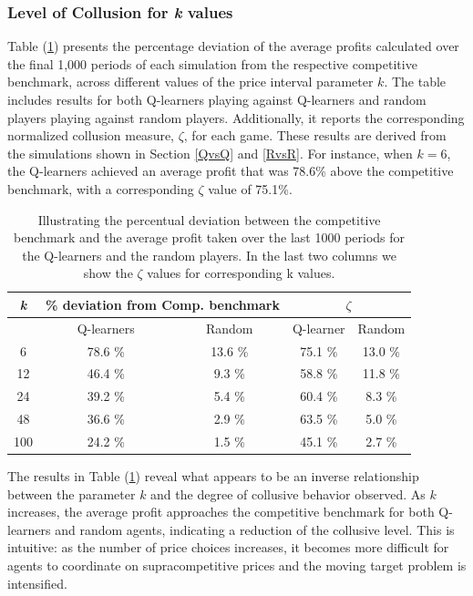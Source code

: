 \documentclass{article}
\begin{document}
\subsubsection{Level of Collusion for \textit{k} values}
\label{Level of Collusion for k values}
Table (\ref{tab:LevelCollusion}) presents the percentage deviation of the average profits calculated over the final 1,000 periods of each simulation from the respective competitive benchmark, across different values of the price interval parameter $k$. The table includes results for both Q-learners playing against Q-learners and random players playing against random players. Additionally, it reports the corresponding normalized collusion measure, $\zeta$, for each game. These results are derived from the simulations shown in Section \ref{QvsQ} and \ref{RvsR}. For instance, when $k = 6$, the Q-learners achieved an average profit that was 78.6\% above the competitive benchmark, with a corresponding $\zeta$ value of 75.1\%.
\begin{table}[H]
    \centering
    \begin{tabular}{|c|c|c|c|c|}
        \hline
        \textit{k} & \multicolumn{2}{c|}{\% deviation from Comp. benchmark} & \multicolumn{2}{c|}{$\zeta$}\\
        \hline
        & Q-learners & Random & Q-learner & Random \\
        \hline
        6 & 78.6 \%  & 13.6 \% & 75.1 \% & 13.0 \% \\
        \hline
        12 & 46.4 \% & 9.3 \%  & 58.8 \% & 11.8 \% \\
        \hline 
        24 & 39.2 \% & 5.4 \%  & 60.4 \% & 8.3 \% \\
        \hline
        48 & 36.6 \% & 2.9 \%  & 63.5 \% & 5.0 \% \\
        \hline
        100 & 24.2 \% & 1.5 \%  & 45.1 \% & 2.7 \% \\
        \hline
    \end{tabular}
    \caption{Illustrating the percentual deviation between the competitive benchmark and the average profit taken over the last 1000 periods for the Q-learners and the random players. In the last two columns we show the $\zeta$ values for corresponding k values.}
    \label{tab:LevelCollusion}
\end{table}
The results in Table (\ref{tab:LevelCollusion}) reveal what appears to be an inverse relationship between the parameter $k$ and the degree of collusive behavior observed. As $k$ increases, the average profit approaches the competitive benchmark for both Q-learners and random agents, indicating a reduction of the collusive level. This is intuitive: as the number of price choices increases, it becomes more difficult for agents to coordinate on supracompetitive prices and the moving target problem is intensified. 
\end{document}

